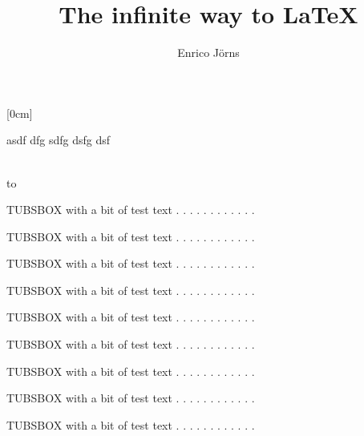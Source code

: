 \documentclass[a4paper,portrait]{scrreprt}
\makeatletter
\renewcommand{\maketitle}{%
\setlength{\fboxsep}{0cm}%
\hspace*{-\tubspage@borderwidth}%
\raisebox{\tubspage@borderwidth}[0cm]{%
\colorbox{tuSecondaryLight}{%
  \begin{minipage}[t][\textheight+2\tubspage@borderwidth]{\textwidth+2\tubspage@borderwidth}%
      \LARGE asdf dfg sdfg dsfg dsf
  \end{minipage}%
}}%
\vspace*{-0.75\tulogoHeight}\vspace{-\textheight}\vspace*{-2\tubspage@borderwidth}\\%
\hspace*{-2\tubspage@borderwidth}%
\colorbox{tuRed}{%
\hbox to \tulogoWidth{\vbox to \tulogoHeight{\tubslogo}}%
}\vspace*{-0.25\tulogoHeight}%
}
\makeatother
\begin{document}
\author{Enrico Jörns}
\title{The infinite way to LaTeX}

\maketitle

\newpage



\begin{tubsbox}[tuBlueLight20]{0}{1}{3}{1}
  TUBSBOX with a bit of test text . . . . . . . . . . . .
\end{tubsbox}
\begin{tubsbox}[tuBlueLight20]{3}{1}{3}{1}
  TUBSBOX with a bit of test text . . . . . . . . . . . .
\end{tubsbox}
\begin{tubsbox}[tuBlueLight20]{1}{2}{1}{1}
  TUBSBOX with a bit of test text . . . . . . . . . . . .
\end{tubsbox}
\begin{tubsbox}[tuBlueLight20]{0}{3}{1}{1}
  TUBSBOX with a bit of test text . . . . . . . . . . . .
\end{tubsbox}
\begin{tubsbox}[tuBlueLight20]{1}{4}{1}{1}
  TUBSBOX with a bit of test text . . . . . . . . . . . .
\end{tubsbox}
\begin{tubsbox}[tuBlueLight20]{2}{5}{1}{1}
  TUBSBOX with a bit of test text . . . . . . . . . . . .
\end{tubsbox}
\begin{tubsbox}[tuBlueLight20]{3}{6}{1}{1}
  TUBSBOX with a bit of test text . . . . . . . . . . . .
\end{tubsbox}
\begin{tubsbox}[tuBlueLight20]{4}{7}{1}{1}
  TUBSBOX with a bit of test text . . . . . . . . . . . .
\end{tubsbox}
\begin{tubsbox}[tuBlueLight20]{5}{8}{1}{1}
  TUBSBOX with a bit of test text . . . . . . . . . . . .
\end{tubsbox}
\end{document}
